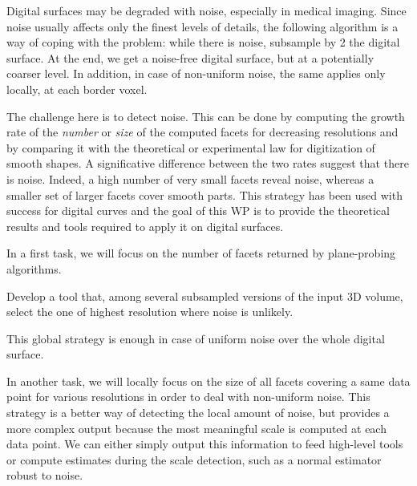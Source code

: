 Digital surfaces may be degraded with noise, especially in medical imaging.
Since noise usually affects only the finest levels of details, the following algorithm
is a way of coping with the problem: while there is noise, subsample by 2 the digital surface.
At the end, we get a noise-free digital surface, but at a potentially coarser level.
In addition, in case of non-uniform noise, the same applies only locally, \ie at each border voxel.  

The challenge here is to detect noise. This can be done by computing the growth rate of the
\emph{number} or \emph{size} of the computed facets for decreasing resolutions
and by comparing it with the theoretical or experimental law for digitization of smooth shapes.
A significative difference between the two rates suggest that there is noise.
Indeed, a high number of very small facets reveal noise, whereas
a smaller set of larger facets cover smooth parts.     
This strategy has been used with success for digital curves \cite{Kerautret2012}
and the goal of this WP is to provide the theoretical results and tools required to apply it on digital surfaces. 


In a first task, we will focus on the number of facets returned by plane-probing algorithms.

\begin{Task}
  \label{task:global}
  Develop a tool that, among several subsampled versions of the input 3D volume,
  select the one of highest resolution where noise is unlikely.
\end{Task}

This global strategy is enough in case of uniform noise over the whole digital surface.  

In another task, we will locally focus on the size of all facets covering a same data point
for various resolutions in order to deal with non-uniform noise. 
This strategy is a better way of detecting the local amount of noise,
but provides a more complex output because the most meaningful scale is
computed at each data point.
We can either simply output this information to feed high-level tools
or compute estimates during the scale detection, such as a normal estimator
robust to noise.  

